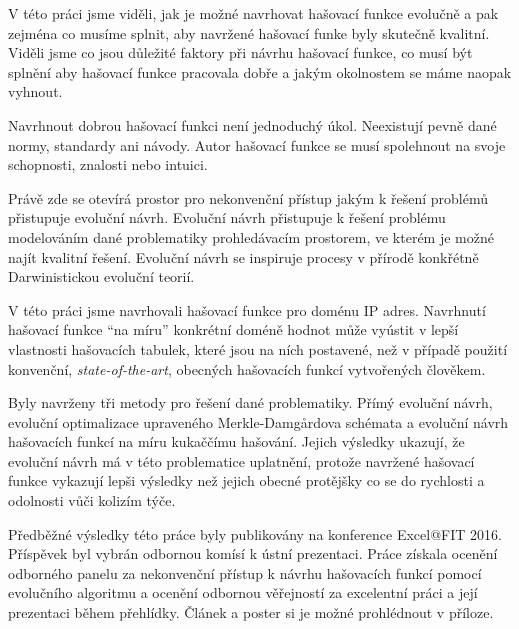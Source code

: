
V této práci jsme viděli, jak je možné navrhovat hašovací funkce evolučně
a pak zejména co musíme splnit, aby navržené hašovací funke byly skutečně
kvalitní. Viděli jsme co jsou důležité faktory při návrhu hašovací 
funkce, co musí být splnění aby hašovací funkce pracovala dobře a jakým
okolnostem se máme naopak vyhnout.

Navrhnout dobrou hašovací funkci není jednoduchý úkol. Neexistují pevně dané normy,
standardy ani návody. Autor hašovací funkce se musí spolehnout na svoje schopnosti,
znalosti nebo intuici.

Právě zde se otevírá prostor pro nekonvenční přístup jakým k řešení
problémů přistupuje evoluční návrh. Evoluční návrh přistupuje k řešení problému
modelováním dané problematiky prohledávacím prostorem, ve kterém je možné najít
kvalitní řešení. Evoluční návrh se inspiruje procesy v přírodě konkřétně Darwinistickou
evoluční teorií.

V této práci jsme navrhovali hašovací funkce pro doménu IP adres. Navrhnutí hašovací funkce 
``na míru'' konkrétní doméně hodnot může vyústit v lepší vlastnosti hašovacích tabulek, které
jsou na ních postavené, než v případě použití konvenční, \textit{state-of-the-art}, obecných hašovacích
funkcí vytvořených člověkem.

Byly navrženy tři metody pro řešení dané problematiky. Přímý evoluční návrh, evoluční optimalizace upraveného
Merkle-Damg\r{a}rdova schémata a evoluční návrh hašovacích funkcí na míru kukaččímu hašování.
Jejich výsledky ukazují, že evoluční návrh
má v této problematice uplatnění, protože navržené hašovací funkce vykazují lepši výsledky než jejich
obecné protějšky co se do rychlosti a odolnosti vůči kolizím týče. 

Předběžné výsledky této práce byly publikovány na konference Excel@FIT 2016. Příspěvek byl vybrán
odbornou komísí k ústní prezentaci. Práce získala ocenění odborného panelu za nekonvenční přístup k návrhu hašovacích
funkcí pomocí evolučního algoritmu a ocenění odbornou věřejností za excelentní práci a její prezentaci během přehlídky. Článek
a poster si je možné prohlédnout v příloze.

